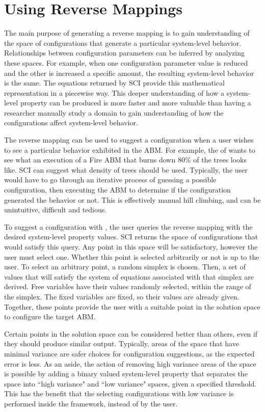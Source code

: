 \section{Using Reverse Mappings}

The main purpose of generating a reverse mapping is to gain understanding of the space of configurations that generate a particular system-level behavior.
Relationships between configuration parameters can be inferred by analyzing these spaces.
For example, when one configuration parameter value is reduced and the other is increased a specific amount, the resulting system-level behavior is the same.
The equations returned by SCI provide this mathematical representation in a piecewise way.
This deeper understanding of how a system-level property can be produced is more faster and more valuable than having a researcher manually study a domain to gain understanding of how the configurations affect system-level behavior.

The reverse mapping can be used to suggest a configuration when a user wishes to see a particular behavior exhibited in the ABM.
For example, the of \fw wants to see what an execution of a Fire ABM that burns down 80\% of the trees looks like.
SCI can suggest what density of trees should be used.
Typically, the user would have to go through an iterative process of guessing a possible configuration, then executing the ABM to determine if the configuration generated the behavior or not.
This is effectively manual hill climbing, and can be unintuitive, difficult and tedious.

To suggest a configuration with \fw, the user queries the reverse mapping with the desired system-level property values.
SCI returns the space of configurations that would satisfy this query.
Any point in this space will be satisfactory, however the user must select one.
Whether this point is selected arbitrarily or not is up to the user.
To select an arbitrary point, a random simplex is chosen.
Then, a set of values that will satisfy the system of equations associated with that simplex are derived.
Free variables have their values randomly selected, within the range of the simplex.
The fixed variables are fixed, so their values are already given.
Together, these points provide the user with a suitable point in the solution space to configure the target ABM.

Certain points in the solution space can be considered better than others, even if they should produce similar output.
Typically, areas of the space that have minimal variance are safer choices for configuration suggestions, as the expected error is less.
As an aside, the action of removing high variance areas of the space is possible by adding a binary valued system-level property that separates the space into ``high variance" and ``low variance" spaces, given a specified threshold.
This has the benefit that the selecting configurations with low variance is performed inside the framework, instead of by the user.


